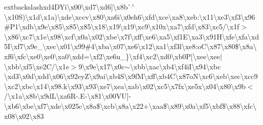 extbackslash{}xd4\+D\+Yi\textbackslash{}x00\textbackslash{}xd7\textbackslash{}xd6\mbox{]}\textbackslash{}x8b\`{}$^\wedge$\textbackslash{}x10\+S)\textbackslash{}x1d\textbackslash{}x1a)\textbackslash{}xde\textbackslash{}xccv\textbackslash{}x80\textbackslash{}xa6i\textbackslash{}x0eh6\textbackslash{}xfd\textbackslash{}xce\textbackslash{}xa8\textbackslash{}xeb\+:\textbackslash{}x11\textbackslash{}xe3\textbackslash{}xf3\textbackslash{}x96\#\+P1\textbackslash{}xdb\textbackslash{}x9e\textbackslash{}x85\textbackslash{}x85\textbackslash{}x85\textbackslash{}x18\textbackslash{}x19\textbackslash{}x19\textbackslash{}xc9\textbackslash{}x10x\textbackslash{}xa7\textbackslash{}xfd\textbackslash{}x83\textbackslash{}xc5/\textbackslash{}x1f$>$\textbackslash{}x86\textbackslash{}xc7\textbackslash{}x1e\textbackslash{}x98\textbackslash{}xcf\textbackslash{}x0a\textbackslash{}x02\textbackslash{}xbe\textbackslash{}x7f\textbackslash{}xff\textbackslash{}xe6\textbackslash{}xa5\textbackslash{}xf1\+E\textbackslash{}xa3\textbackslash{}x91\+H\textbackslash{}xfe\textquotesingle{}\textbackslash{}xfa\textbackslash{}xd5\+I\textbackslash{}xf7\textbackslash{}x9e\+\_\+\textbackslash{}xec\textbackslash{}x01\textbackslash{}x99\#4\textbackslash{}xba\textbackslash{}x07\textbackslash{}xe6\textbackslash{}x12\textbackslash{}xa1\textbackslash{}xf3l\textbackslash{}xe8\+:o\+C\textbackslash{}x87\textbackslash{}x80\$\textbackslash{}x8a\textbackslash{}xf6\textbackslash{}xfc\textbackslash{}xe0\textbackslash{}xe0\textbackslash{}xa0\textbackslash{}xdd=\textbackslash{}xf2\textbackslash{}xe6u\+\_\+\}\textbackslash{}xf4\textbackslash{}xc2\textbackslash{}xd0\textbackslash{}xb0\+P\mbox{[}\textbackslash{}xee\textbackslash{}xee$\vert$\textbackslash{}xbb\textbackslash{}xf5\textbackslash{}xe2\+C/\textbackslash{}x1e$>$9\textbackslash{}x9e\textbackslash{}x17\textbackslash{}x0c$\sim$\textbackslash{}xbb\textbackslash{}xac\textbackslash{}xb4\textbackslash{}xf4i\+I\textbackslash{}x94\textbackslash{}xbc \textbackslash{}xd3\textbackslash{}x0d\textbackslash{}xdd\textbackslash{}x06\textbackslash{}x92ey\+Z\textbackslash{}x9ai\textbackslash{}xb4\+S\textbackslash{}x9f\+M\textbackslash{}xff\textbackslash{}xb4\+C\textbackslash{}x87o\+N\textbackslash{}xc6\textbackslash{}xeb\textbackslash{}xec\textbackslash{}xcc9\textbackslash{}xc2\textbackslash{}xbc\textbackslash{}x14\textbackslash{}x98.\+k\textbackslash{}x93\textbackslash{}x93\textbackslash{}xe7\textbackslash{}xea\textbackslash{}xab\textbackslash{}x02\textbackslash{}xc5\textbackslash{}x7fx\textbackslash{}xe5x\textbackslash{}x04\textbackslash{}x80\textbackslash{}x9b$<$/\textbackslash{}x1a\textbackslash{}x8b\textbackslash{}x9d\+L\textbackslash{}xa6\+R-\/.\+E-\/\textbackslash{}x81\textbackslash{}x00\+V\+U\mbox{]}-\/\textbackslash{}xb6\textbackslash{}xbe\textbackslash{}xf7\textbackslash{}xde\textbackslash{}x025c\textbackslash{}x8a\$\textbackslash{}xcb\textbackslash{}x8a\textbackslash{}x22+\textbackslash{}xaa\$\textbackslash{}x89\textbackslash{}x0a\textbackslash{}xf5\textbackslash{}xbf\$\textbackslash{}x88\textbackslash{}xfc\textbackslash{}x08\textbackslash{}x02\textbackslash{}x83 